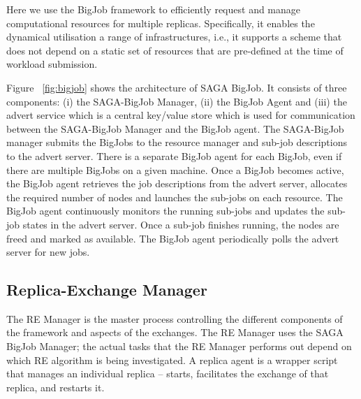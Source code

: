 \documentclass{rspublic}
\newcommand{\jhanote}[1]{ {\textcolor{red} { ***shantenu: #1 }}}
\newcommand{\athotanote}[1]{ {\textcolor{green} { ***athota: #1 }}}
\newcommand{\athotanote}[1]{}
\newcommand{\jhanote}[1]{}
\begin{document}
Here we use the BigJob framework to efficiently request and manage
computational resources for multiple replicas.  Specifically, it
enables the dynamical utilisation a range of infrastructures, i.e., it
supports a scheme that does not depend on a static set of resources
that are pre-defined at the time of workload submission.

Figure ~\ref{fig:bigjob} shows the architecture of SAGA BigJob.  It
consists of three components: (i) the SAGA-BigJob Manager, (ii) the
BigJob Agent and (iii) the advert service which is a central key/value
store which is used for communication between the SAGA-BigJob Manager
and the BigJob agent.  The SAGA-BigJob manager submits the BigJobs to
the resource manager and sub-job descriptions to the advert server.
There is a separate BigJob agent for each BigJob, even if there are
multiple BigJobs on a given machine.  Once a BigJob becomes active,
the BigJob agent retrieves the job descriptions from the advert
server, allocates the required number of nodes and launches the
sub-jobs on each resource. The BigJob agent continuously monitors the
running sub-jobs and updates the sub-job states in the advert
server. Once a sub-job finishes running, the nodes are freed and
marked as available. The BigJob agent periodically polls the advert
server for new jobs.

\subsection{Replica-Exchange Manager}\label{repexmanager} 

  
  
The RE Manager is the master process controlling the different
components of the framework and aspects of the exchanges.  The RE
Manager %
uses the SAGA BigJob Manager; the actual tasks that the RE Manager
performs out depend on which RE algorithm is being investigated.  A
replica agent is a wrapper script that manages an individual
replica  -- starts, facilitates the exchange of that replica,
and restarts it.
\end{document}
